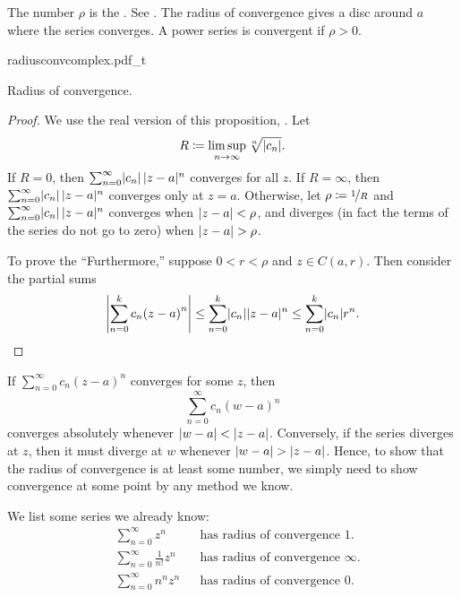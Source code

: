 The number $\rho$ is the \emph{}.
See .
The radius of convergence gives a disc around $a$ where the series converges.  A power series
is convergent if $\rho > 0$.
\begin{myfigureht}
{radiusconvcomplex.pdf_t}
\caption{Radius of convergence.\label{fig:radiusconvcomplex}}
\end{myfigureht}

\begin{proof}
We use the real version of this proposition,
.
Let
\begin{equation*}
R \coloneqq \limsup_{n\to\infty} \sqrt[n]{\lvert {c_n} \rvert} .
\end{equation*}
If $R = 0$, then
$\sum_{n=0}^\infty \lvert {c_n} \rvert \, \lvert {z-a} \rvert^n$ converges for all $z$.
If $R = \infty$, then
$\sum_{n=0}^\infty \lvert {c_n} \rvert \, \lvert {z-a} \rvert^n$ converges only at $z=a$.
Otherwise, let $\rho \coloneqq \nicefrac{1}{R}$ and
$\sum_{n=0}^\infty \lvert {c_n} \rvert \, \lvert {z-a} \rvert^n$ converges when
$\lvert {z-a} \rvert < \rho$, and diverges (in fact the terms of the series
do not go to zero) when $\lvert {z-a} \rvert > \rho$.

To prove the ``Furthermore,'' suppose
$0 < r < \rho$ and $z \in C(a,r)$.  Then
consider the partial sums
\begin{equation*}
\left\lvert {\sum_{n=0}^k c_n {(z-a)}^n} \right\rvert
\leq
\sum_{n=0}^k \lvert {c_n} \rvert \lvert {z-a} \rvert^n
\leq
\sum_{n=0}^k \lvert {c_n} \rvert r^n . \qedhere
\end{equation*}
\end{proof}

If $\sum_{n=0}^\infty c_n {(z-a)}^n$ converges for some $z$, then
\begin{equation*}
\sum_{n=0}^\infty c_n {(w-a)}^n
\end{equation*}
converges absolutely whenever $\lvert {w-a} \rvert < \lvert {z-a} \rvert$.
Conversely, if the series diverges at $z$, then it must diverge at $w$
whenever $\lvert {w-a} \rvert > \lvert {z-a} \rvert$.
Hence, to show
that the radius of convergence is at least some number, we simply need to
show convergence at some point by any method we know.

\begin{example}
We list some series we already know:
\begin{align*}
& &
& \sum_{n=0}^\infty z^n
& & \text{has radius of convergence } 1.
& &
\\
& &
& \sum_{n=0}^\infty \frac{1}{n!} z^n
& & \text{has radius of convergence } \infty.
& &
\\
& &
& \sum_{n=0}^\infty n^n z^n
& & \text{has radius of convergence } 0.
& &
\end{align*}
\end{example}

